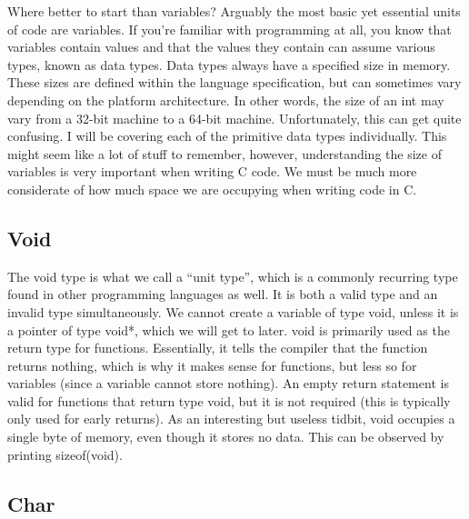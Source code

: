\documentclass{article}
\begin{document}
Where better to start than variables? Arguably the most basic yet essential units of code are variables. If
you’re familiar with programming at all, you know that variables contain values and that the values they
contain can assume various types, known as data types. Data types always have a specified size in memory.
These sizes are defined within the language specification, but can sometimes vary depending on the platform
architecture. In other words, the size of an int may vary from a 32-bit machine to a 64-bit machine.
Unfortunately, this can get quite confusing. I will be covering each of the primitive data types individually.
This might seem like a lot of stuff to remember, however, understanding the size of variables is very
important when writing C code. We must be much more considerate of how much space we are occupying when
writing code in C.

\subsection{Void}

The void type is what we call a “unit type”, which is a commonly recurring type found in other programming
languages as well. It is both a valid type and an invalid type simultaneously. We cannot create a variable of
type void, unless it is a pointer of type void*, which we will get to later. void is primarily used as the
return type for functions. Essentially, it tells the compiler that the function returns nothing, which is why
it makes sense for functions, but less so for variables (since a variable cannot store nothing). An empty
return statement is valid for functions that return type void, but it is not required (this is typically only
used for early returns). As an interesting but useless tidbit, void occupies a single byte of memory, even
though it stores no data. This can be observed by printing sizeof(void).

\subsection{Char}
\end{document}
